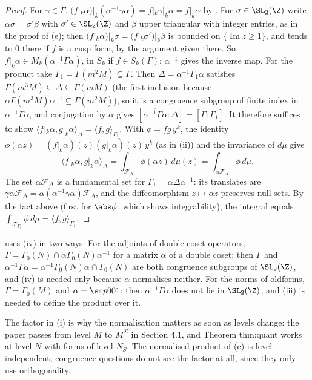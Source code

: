 \begin{proof}
For $\gamma\in\Gamma$, $(f|_k\alpha)|_k(\alpha^{-1}\gamma\alpha)=f|_k\gamma|_k\alpha=f|_k\alpha$ by . For $\sigma\in\SL_2(\Z)$ write $\alpha\sigma=\sigma'\beta$ with $\sigma'\in\SL_2(\Z)$ and
$\beta$ upper triangular with integer entries, as in the proof of (e); then $(f|_k\alpha)|_k\sigma=(f|_k\sigma')|_k\beta$ is bounded on $\{\operatorname{Im}z\ge1\}$,
and tends to $0$ there if $f$ is a cusp form, by the argument given there. So $f|_k\alpha\in M_k(\alpha^{-1}\Gamma\alpha)$, in $S_k$ if $f\in S_k(\Gamma)$; $\alpha^{-1}$ gives the inverse map.
For the product take $\Gamma_1=\Gamma(m^2M)\subseteq\Gamma$. Then $\Delta=\alpha^{-1}\Gamma_1\alpha$ satisfies $\Gamma(m^3M)\subseteq\Delta\subseteq\Gamma(mM)$ (the first inclusion because
$\alpha\Gamma(m^3M)\alpha^{-1}\subseteq\Gamma(m^2M)$), so it is a congruence subgroup of finite index in $\alpha^{-1}\Gamma\alpha$, and conjugation by $\alpha$ gives
$[\overline{\alpha^{-1}\Gamma\alpha}:\bar\Delta]=[\bar\Gamma:\bar\Gamma_1]$. It therefore suffices to show $\langle f|_k\alpha,g|_k\alpha\rangle_\Delta=\langle f,g\rangle_{\Gamma_1}$. With $\phi=f\bar g\,y^k$, the
identity $\phi(\alpha z)=(f|_k\alpha)(z)\overline{(g|_k\alpha)(z)}\,y^k$ (as in (ii)) and the invariance of $d\mu$ give
\[
\langle f|_k\alpha,g|_k\alpha\rangle_\Delta=\int_{\mathcal F_\Delta}\phi(\alpha z)\,d\mu(z)=\int_{\alpha\mathcal F_\Delta}\phi\,d\mu .
\]
The set $\alpha\mathcal F_\Delta$ is a fundamental set for $\Gamma_1=\alpha\Delta\alpha^{-1}$: its translates are $\gamma\alpha\mathcal F_\Delta=\alpha(\alpha^{-1}\gamma\alpha)\mathcal F_\Delta$, and the diffeomorphism
$z\mapsto\alpha z$ preserves null sets. By the fact above (first for $\abs\phi$, which shows integrability), the integral equals $\int_{\mathcal F_{\Gamma_1}}\phi\,d\mu=\langle f,g\rangle_{\Gamma_1}$.
\end{proof}

 uses (iv) in two ways. For the adjoints of double coset operators, $\Gamma=\Gamma_0(N)\cap\alpha\Gamma_0(N)\alpha^{-1}$ for a matrix $\alpha$ of a
double coset; then $\Gamma$ and $\alpha^{-1}\Gamma\alpha=\alpha^{-1}\Gamma_0(N)\alpha\cap\Gamma_0(N)$ are both congruence subgroups of $\SL_2(\Z)$, and (iv) is needed
only because $\alpha$ normalises neither. For the norms of oldforms, $\Gamma=\Gamma_0(M)$ and $\alpha=\sm p001$; then $\alpha^{-1}\Gamma\alpha$ does not lie in
$\SL_2(\Z)$, and (iii) is needed to define the product over it.

The factor in (i) is why the normalisation matters as soon as levels change: the paper passes from level $M$ to $M^\Sigma$ in Section 4.1, and Theorem thm:quant works at level
$N$ with forms of level $N_S$. The normalised product of (c) is level-independent; congruence questions do not see the factor at all,
since they only use orthogonality.


